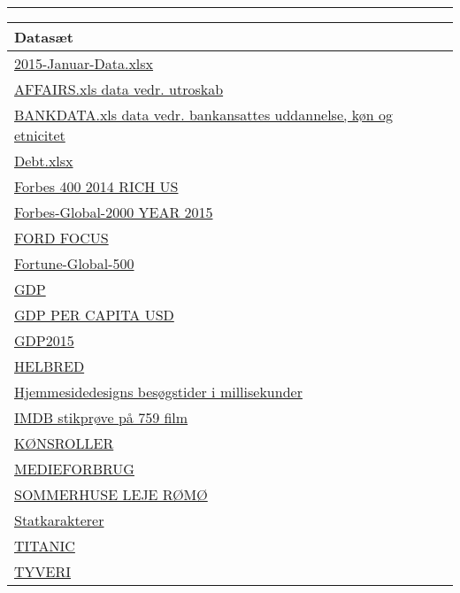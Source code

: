 \documentclass[]{book}
\begin{document}
\begin{center}\rule{0.5\linewidth}{\linethickness}\end{center}

\begin{longtable}[]{@{}l@{}}
\toprule
Datasæt\tabularnewline
\midrule
\endhead
\href{https://drive.google.com/uc?export=download\&id=0B1E7VnhxsDMldkt1OUx6LTEyMXM}{2015-Januar-Data.xlsx}\tabularnewline
\href{https://drive.google.com/uc?export=download\&id=0B1E7VnhxsDMlRlVQcFBtdVlHZ1U}{AFFAIRS.xls
data vedr. utroskab}\tabularnewline
\href{https://drive.google.com/uc?export=download\&id=0B1E7VnhxsDMlRENKWWxlNlBXbmM}{BANKDATA.xls
data vedr. bankansattes uddannelse, køn og etnicitet}\tabularnewline
\href{https://drive.google.com/uc?export=download\&id=0B1E7VnhxsDMlUGdpNXZjWm1sNk0}{Debt.xlsx}\tabularnewline
\href{https://drive.google.com/uc?export=download\&id=0B1E7VnhxsDMlYTRWVWozb09PRTQ}{Forbes
400 2014 RICH US}\tabularnewline
\href{https://drive.google.com/uc?export=download\&id=0B1E7VnhxsDMlNEdtLUV3NFJTSkk}{Forbes-Global-2000
YEAR 2015}\tabularnewline
\href{https://drive.google.com/uc?export=download\&id=0B1E7VnhxsDMlNTkzeVJlQV81OHM}{FORD
FOCUS}\tabularnewline
\href{https://drive.google.com/uc?export=download\&id=0B1E7VnhxsDMlQm51dXNjM3NmdE0}{Fortune-Global-500}\tabularnewline
\href{https://drive.google.com/uc?export=download\&id=0B1E7VnhxsDMlQUhPbEgxdmJhZTg}{GDP}\tabularnewline
\href{https://drive.google.com/uc?export=download\&id=0B1E7VnhxsDMlSVkweHBpT19GZjg}{GDP
PER CAPITA USD}\tabularnewline
\href{https://drive.google.com/uc?export=download\&id=0B1E7VnhxsDMlamdFSkk4SWU4eWM}{GDP2015}\tabularnewline
\href{https://drive.google.com/uc?export=download\&id=0B1E7VnhxsDMlMTM1UUNMdzdoUm8}{HELBRED}\tabularnewline
\href{https://drive.google.com/uc?export=download\&id=0B1E7VnhxsDMlS3Y5ZUhROU9iNnM}{Hjemmesidedesigns
besøgstider i millisekunder}\tabularnewline
\href{https://drive.google.com/uc?export=download\&id=0B1E7VnhxsDMlWlFNLTVoMEU1WHM}{IMDB
stikprøve på 759 film}\tabularnewline
\href{https://drive.google.com/uc?export=download\&id=0B1E7VnhxsDMlalR4TGdjSkV0RzA}{KØNSROLLER}\tabularnewline
\href{https://drive.google.com/uc?export=download\&id=0B1E7VnhxsDMlSTFXM1pCMUtjc2M}{MEDIEFORBRUG}\tabularnewline
\href{https://drive.google.com/uc?export=download\&id=0B1E7VnhxsDMlOWNjUzlQd0s4TVE}{SOMMERHUSE
LEJE RØMØ}\tabularnewline
\href{https://drive.google.com/uc?export=download\&id=0B1E7VnhxsDMlRURnNjk0UnJSYzQ}{Statkarakterer}\tabularnewline
\href{https://drive.google.com/uc?export=download\&id=0B1E7VnhxsDMlYWJOOG5yamNoOTQ}{TITANIC}\tabularnewline
\href{https://drive.google.com/uc?export=download\&id=0B1E7VnhxsDMlMFZJdm5QdXpGTGc}{TYVERI}\tabularnewline

\end{longtable}
\end{document}

